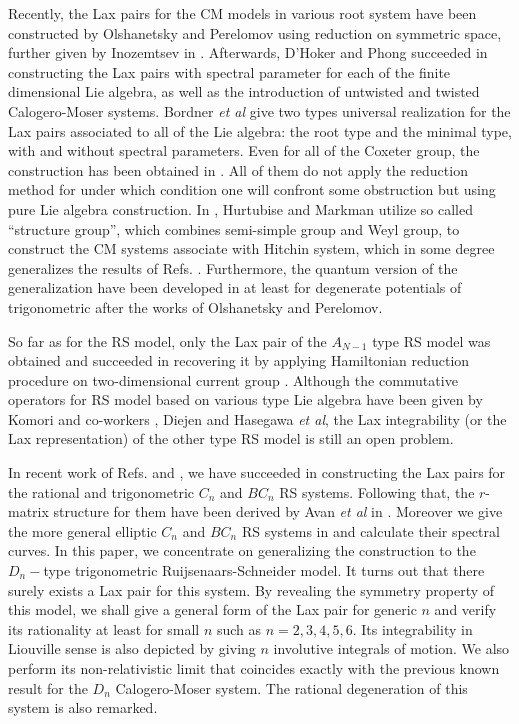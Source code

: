 \documentclass[a4paper,12pt]{article}
\begin{document}
Recently, the Lax pairs for the CM models in various root system have been
constructed by Olshanetsky and Perelomov\cite{op} using reduction on
symmetric space, further given by Inozemtsev in \cite{in}. Afterwards,
D'Hoker and Phong\cite{hp1} succeeded in constructing the Lax pairs with
spectral parameter for each of the finite dimensional Lie algebra, as well
as the introduction of untwisted and twisted Calogero-Moser systems. Bordner
\textit{et al}\cite{bcs,bcs2,bcs3} give two types universal realization for
the Lax pairs associated to all of the Lie algebra: the root type and the
minimal type, with and without spectral parameters. Even for all of the
Coxeter group, the construction has been obtained in \cite{bcs1}. All of
them do not apply the reduction method for under which condition one will
confront some obstruction\cite{hm} but using pure Lie algebra construction.
In \cite{hm}, Hurtubise and Markman utilize so called ``structure group'',
which combines semi-simple group and Weyl group, to construct the CM systems
associate with Hitchin system, which in some degree generalizes the results
of Refs. \cite{hp1,bcs,bcs2,bcs3,bcs1}. Furthermore, the quantum version of
the generalization have been developed in \cite{bms,kps} at least for
degenerate potentials of trigonometric after the works of Olshanetsky and
Perelomov\cite{op1}.

So far as for the RS model, only the Lax pair of the $A_{N-1}$ type RS model
was obtained \cite{r1,nksr,bc,kz,s1,s2} and succeeded in recovering it by
applying Hamiltonian reduction procedure on two-dimensional current group
\cite{aru}. Although the commutative operators for RS model based on various
type Lie algebra have been given by Komori and co-workers \cite{ko1}, Diejen%
\cite{di,di1} and Hasegawa \textit{et al}\cite{h1,h2}, the Lax integrability
(or the Lax representation) of the other type RS model is still an open
problem\cite{bm1}.

In recent work of Refs. \cite{kai3} and \cite{Che00}, we have succeeded in
constructing the Lax pairs for the rational and trigonometric $C_{n}$ and $BC_{n}
$ RS systems. Following that, the $r$-matrix structure for them have been
derived by Avan \textit{et al} in \cite{Avan}. Moreover we give the more
general elliptic $C_{n}$ and $BC_{n}$ RS systems in \cite{Che01} and
calculate their spectral curves. In this paper, we concentrate on
generalizing the construction to the $D_{n}-$type trigonometric
Ruijsenaars-Schneider model. It turns out that there surely exists a Lax
pair for this system. By revealing the symmetry property of this model, we
shall give a general form of the Lax pair for generic  $n$ and verify its
rationality at least for small $n$ such as $n=2,3,4,5,6$. Its integrability
in Liouville sense is also depicted by giving $n$ involutive integrals of
motion. We also perform its non-relativistic limit that coincides exactly
with the previous known result for the $D_{n}$ Calogero-Moser system. The
rational degeneration of this system is also remarked.
\end{document}
